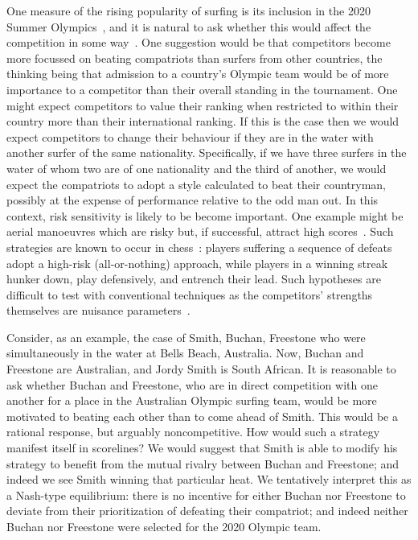 \documentclass{article}
\begin{document}
One measure of the rising popularity of surfing is its inclusion in
the 2020 Summer Olympics~\citep{tulloch2019}, and it is natural to ask
whether this would affect the competition in some way~\citep{ho2021}.
One suggestion would be that competitors become more focussed on
beating compatriots than surfers from other countries, the thinking
being that admission to a country's Olympic team would be of more
importance to a competitor than their overall standing in the
tournament.  One might expect competitors to value their ranking when
restricted to within their country more than their international
ranking.  If this is the case then we would expect competitors to
change their behaviour if they are in the water with another surfer of
the same nationality.  Specifically, if we have three surfers in the
water of whom two are of one nationality and the third of another, we
would expect the compatriots to adopt a style calculated to beat their
countryman, possibly at the expense of performance relative to the odd
man out.  In this context, risk sensitivity is likely to be become
important.  One example might be aerial manoeuvres which are risky
but, if successful, attract high scores~\citep{lundgren2014}.  Such
strategies are known to occur in chess~\citep{hankin2020}: players
suffering a sequence of defeats adopt a high-risk (all-or-nothing)
approach, while players in a winning streak hunker down, play
defensively, and entrench their lead.  Such hypotheses are difficult
to test with conventional techniques as the competitors' strengths
themselves are nuisance parameters~\citep{basu1977}.

Consider, as an example, the case of Smith, Buchan, Freestone who were
simultaneously in the water at Bells Beach, Australia.  Now, Buchan
and Freestone are Australian, and Jordy Smith is South African.  It is
reasonable to ask whether Buchan and Freestone, who are in direct
competition with one another for a place in the Australian Olympic
surfing team, would be more motivated to beating each other than to
come ahead of Smith.  This would be a rational response, but arguably
noncompetitive.  How would such a strategy manifest itself in
scorelines?  We would suggest that Smith is able to modify his
strategy to benefit from the mutual rivalry between Buchan and
Freestone; and indeed we see Smith winning that particular heat.  We
tentatively interpret this as a Nash-type equilibrium: there is no
incentive for either Buchan nor Freestone to deviate from their
prioritization of defeating their compatriot; and indeed neither
Buchan nor Freestone were selected for the 2020 Olympic team.
\end{document}
